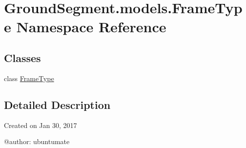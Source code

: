 \hypertarget{namespace_ground_segment_1_1models_1_1_frame_type}{}\section{Ground\+Segment.\+models.\+Frame\+Type Namespace Reference}
\label{namespace_ground_segment_1_1models_1_1_frame_type}
\subsection*{Classes}
\begin{DoxyCompactItemize}
\item 
class \hyperlink{class_ground_segment_1_1models_1_1_frame_type_1_1_frame_type}{Frame\+Type}
\end{DoxyCompactItemize}


\subsection{Detailed Description}
\begin{DoxyVerb}Created on Jan 30, 2017

@author: ubuntumate
\end{DoxyVerb}
 